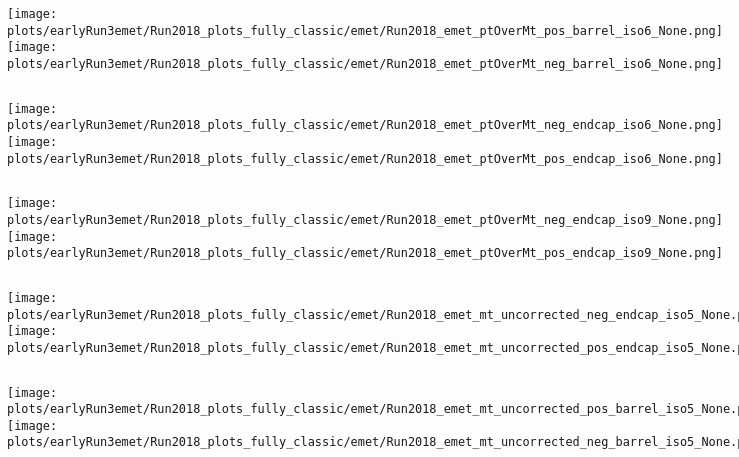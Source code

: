 \documentclass[en,16:9,navbarinfooter]{presentation/sdqbeamer}
\begin{document}
\begin{frame}{\insertsubsection}
   \begin{columns}
   \texttt{[image: plots/earlyRun3emet/Run2018\_plots\_fully\_classic/emet/Run2018\_emet\_ptOverMt\_pos\_barrel\_iso6\_None.png]}
   \texttt{[image: plots/earlyRun3emet/Run2018\_plots\_fully\_classic/emet/Run2018\_emet\_ptOverMt\_neg\_barrel\_iso6\_None.png]}
\end{columns}
\end{frame}

\begin{frame}{\insertsubsection}
   \begin{columns}
   \texttt{[image: plots/earlyRun3emet/Run2018\_plots\_fully\_classic/emet/Run2018\_emet\_ptOverMt\_neg\_endcap\_iso6\_None.png]}
   \texttt{[image: plots/earlyRun3emet/Run2018\_plots\_fully\_classic/emet/Run2018\_emet\_ptOverMt\_pos\_endcap\_iso6\_None.png]}
\end{columns}
\end{frame}

\begin{frame}{\insertsubsection}
   \begin{columns}
   \texttt{[image: plots/earlyRun3emet/Run2018\_plots\_fully\_classic/emet/Run2018\_emet\_ptOverMt\_neg\_endcap\_iso9\_None.png]}
   \texttt{[image: plots/earlyRun3emet/Run2018\_plots\_fully\_classic/emet/Run2018\_emet\_ptOverMt\_pos\_endcap\_iso9\_None.png]}
\end{columns}
\end{frame}

\begin{frame}{\insertsubsection}
   \begin{columns}
   \texttt{[image: plots/earlyRun3emet/Run2018\_plots\_fully\_classic/emet/Run2018\_emet\_mt\_uncorrected\_neg\_endcap\_iso5\_None.png]}
   \texttt{[image: plots/earlyRun3emet/Run2018\_plots\_fully\_classic/emet/Run2018\_emet\_mt\_uncorrected\_pos\_endcap\_iso5\_None.png]}
\end{columns}
\end{frame}

\begin{frame}{\insertsubsection}
   \begin{columns}
   \texttt{[image: plots/earlyRun3emet/Run2018\_plots\_fully\_classic/emet/Run2018\_emet\_mt\_uncorrected\_pos\_barrel\_iso5\_None.png]}
   \texttt{[image: plots/earlyRun3emet/Run2018\_plots\_fully\_classic/emet/Run2018\_emet\_mt\_uncorrected\_neg\_barrel\_iso5\_None.png]}
\end{columns}
\end{frame}
\end{document}

